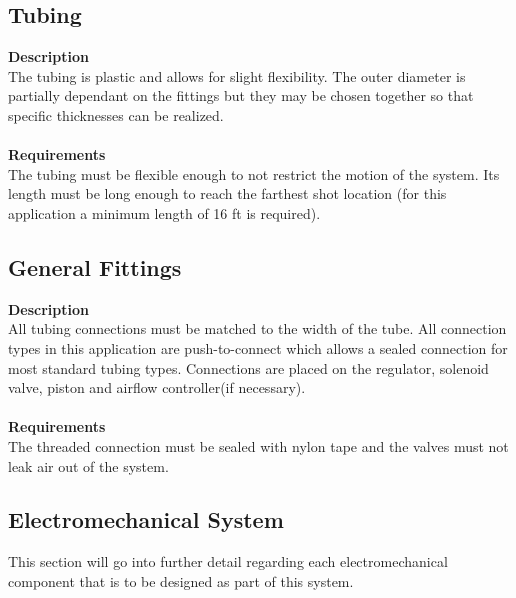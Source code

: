 \documentclass[titlepage]{article}
\begin{document}
\begin{center}
\begin{center}
\begin{center}
\begin{center}
\begin{center}
\begin{center}
\begin{center}
\begin{center}
\begin{center}
\begin{center}
\begin{center}
\begin{center}
\begin{center}
\begin{center}
\begin{center}
\begin{center}
\begin{center}
\begin{center}
\subsection{Tubing}
\textbf{Description}\\
The tubing is plastic and allows for slight flexibility. The outer diameter is partially dependant on the fittings but they may be chosen together so that specific thicknesses can be realized.\\\\
\textbf{Requirements}\\
The tubing must be flexible enough to not restrict the motion of the system. Its length must be long enough to reach the farthest shot location (for this application a minimum length of 16 ft is required).
\begin{center}


\subsection{General Fittings}
\textbf{Description}\\
All tubing connections must be matched to the width of the tube. All connection types in this application are push-to-connect which allows a sealed connection for most standard tubing types. Connections are placed on the regulator, solenoid valve, piston and airflow controller(if necessary).\\\\
\textbf{Requirements}\\
The threaded connection must be sealed with nylon tape and the valves must not leak air out of the system.
\begin{center}




















\newpage
\section{Electromechanical System}
This section will go into further detail regarding each electromechanical component that is to be designed as part of this system.

\end{center}
\end{center}
\end{center}
\end{center}
\end{center}
\end{center}
\end{center}
\end{center}
\end{center}
\end{center}
\end{center}
\end{center}
\end{center}
\end{center}
\end{center}
\end{center}
\end{center}
\end{center}
\end{center}
\end{center}
\end{document}

